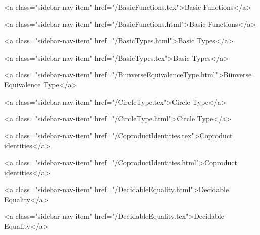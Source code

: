      
    
      
        
          <a class="sidebar-nav-item" href="/BasicFunctions.tex">Basic Functions</a>
        
      
    
      
        
          <a class="sidebar-nav-item" href="/BasicFunctions.html">Basic Functions</a>
        
      
    
      
        
          <a class="sidebar-nav-item" href="/BasicTypes.html">Basic Types</a>
        
      
    
      
        
          <a class="sidebar-nav-item" href="/BasicTypes.tex">Basic Types</a>
        
      
    
      
        
          <a class="sidebar-nav-item" href="/BiinverseEquivalenceType.html">Biinverse Equivalence Type</a>
        
      
    
      
        
          <a class="sidebar-nav-item" href="/CircleType.tex">Circle Type</a>
        
      
    
      
        
          <a class="sidebar-nav-item" href="/CircleType.html">Circle Type</a>
        
      
    
      
        
          <a class="sidebar-nav-item" href="/CoproductIdentities.tex">Coproduct identities</a>
        
      
    
      
        
          <a class="sidebar-nav-item" href="/CoproductIdentities.html">Coproduct identities</a>
        
      
    
      
        
          <a class="sidebar-nav-item" href="/DecidableEquality.html">Decidable Equality</a>
        
      
    
      
        
          <a class="sidebar-nav-item" href="/DecidableEquality.tex">Decidable Equality</a>
        
